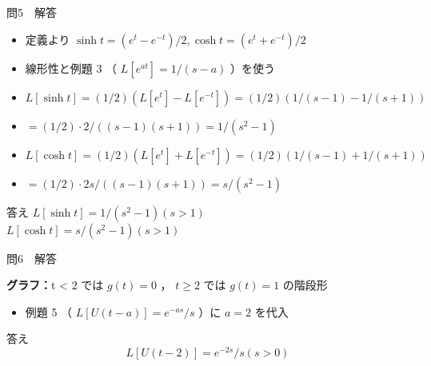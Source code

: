 \documentclass[aspectratio=43,professionalfonts,handout]{beamer}
\begin{document}
\begin{frame}{問5　解答}
  \begin{block}{}
  \begin{itemize}\setlength{\itemsep}{2pt}
    \item 定義より $\sinh t = (e^t - e^{-t})/2, \cosh t = (e^t + e^{-t})/2$
    \item 線形性と例題 3 （ $L[e^{at}] = 1/(s-a)$ ）を使う
    \item $L[\sinh t] = (1/2)(L[e^t] - L[e^{-t}]) = (1/2)(1/(s-1) - 1/(s+1))$
    \item $        = (1/2)\cdot2/((s-1)(s+1)) = 1/(s^{2}-1)$
    \item $L[\cosh t] = (1/2)(L[e^t] + L[e^{-t}]) = (1/2)(1/(s-1) + 1/(s+1))$
    \item $        = (1/2)\cdot2s/((s-1)(s+1)) = s/(s^{2}-1)$
  \end{itemize}
  \end{block}
  \begin{exampleblock}{答え}
  $L[\sinh t] = 1/(s^{2}-1)  (s > 1)$\\
  $L[\cosh t] = s/(s^{2}-1)  (s > 1)$\\
  \end{exampleblock}
\end{frame}

\begin{frame}{問6　解答}
  \begin{block}{}
  \textbf{グラフ：}t < 2 では $g(t) = 0$ ， $t \geq 2$ では $g(t) = 1$ の階段形\\[0.3em]
  \begin{itemize}\setlength{\itemsep}{2pt}
    \item 例題 5 （ $L[U(t-a)] = e^{-as}/s$ ）に $a = 2$ を代入
  \end{itemize}
  \end{block}
  \begin{exampleblock}{答え}
    \[
    L[U(t-2)] = e^{-2s}/s  (s > 0)
  \]
  \end{exampleblock}
\end{frame}
\end{document}
